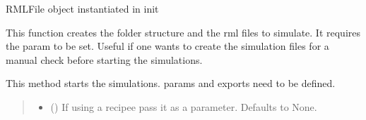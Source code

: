 \documentclass[letterpaper,10pt,english]{sphinxmanual}
\begin{document}
\begin{fulllineitems}
\begin{fulllineitems}
\label{\detokenize{code_documentation:raypyng.simulate.Simulate.rml}}
\pysigstartsignatures
{}
\pysigstopsignatures
\sphinxAtStartPar
RMLFile object instantiated in init

\end{fulllineitems}


\begin{fulllineitems}
\label{\detokenize{code_documentation:raypyng.simulate.Simulate.rml_list}}
\pysigstartsignatures
{}
\pysigstopsignatures
\sphinxAtStartPar
This function creates the folder structure and the rml files to simulate.
It requires the param to be set. Useful if one wants to create the simulation files
for a manual check before starting the simulations.

\end{fulllineitems}


\begin{fulllineitems}
\label{\detokenize{code_documentation:raypyng.simulate.Simulate.run}}
\pysigstartsignatures
{}
\pysigstopsignatures
\sphinxAtStartPar
This method starts the simulations. params and exports need to be defined.
\begin{quote}\begin{description}
\begin{itemize}
\item {} 
\sphinxAtStartPar
{} (\sphinxstyleliteralemphasis{\sphinxupquote{, }}) \textendash{} If using a recipee pass it as a parameter. Defaults to None.


\end{itemize}
\end{description}
\end{quote}
\end{fulllineitems}
\end{fulllineitems}
\end{document}
